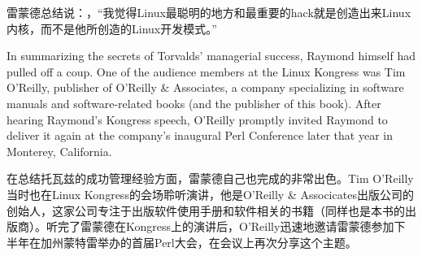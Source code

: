 \ifdefined\chs
雷蒙德总结说：，“我觉得Linux最聪明的地方和最重要的hack就是创造出来Linux内核，而不是他所创造的Linux开发模式。”
\fi




\ifdefined\eng
In summarizing the secrets of Torvalds' managerial success, Raymond himself had pulled off a coup. One of the audience members at the Linux Kongress was Tim O'Reilly, publisher of O'Reilly \& Associates, a company specializing in software manuals and software-related books (and the publisher of this book). After hearing Raymond's Kongress speech, O'Reilly promptly invited Raymond to deliver it again at the company's inaugural Perl Conference later that year in Monterey, California.
\fi

\ifdefined\chs
在总结托瓦兹的成功管理经验方面，雷蒙德自己也完成的非常出色。Tim O'Reilly当时也在Linux Kongress的会场聆听演讲，他是O'Reilly \& Associcates出版公司的创始人，这家公司专注于出版软件使用手册和软件相关的书籍（同样也是本书的出版商）。听完了雷蒙德在Kongress上的演讲后，O'Reilly迅速地邀请雷蒙德参加下半年在加州蒙特雷举办的首届Perl大会，在会议上再次分享这个主题。
\fi

